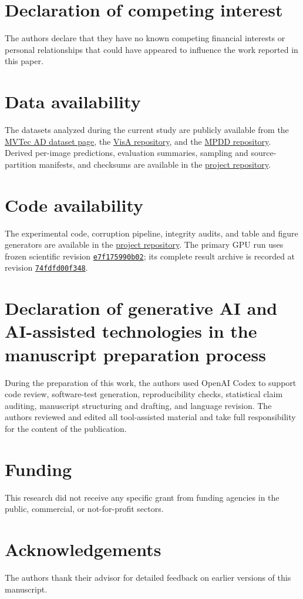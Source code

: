 
\section*{Declaration of competing interest}
The authors declare that they have no known competing financial interests or personal relationships that could have appeared to influence the work reported in this paper.

\section*{Data availability}
The datasets analyzed during the current study are publicly available from the \href{https://www.mvtec.com/company/research/datasets/mvtec-ad}{MVTec AD dataset page}, the \href{https://github.com/amazon-science/spot-diff}{VisA repository}, and the \href{https://github.com/stepanje/MPDD}{MPDD repository}. Derived per-image predictions, evaluation summaries, sampling and source-partition manifests, and checksums are available in the \href{https://github.com/OxyzGiaHuy/AD}{project repository}.

\section*{Code availability}
The experimental code, corruption pipeline, integrity audits, and table and figure generators are available in the \href{https://github.com/OxyzGiaHuy/AD}{project repository}. The primary GPU run uses frozen scientific revision \href{https://github.com/OxyzGiaHuy/AD/commit/e7f175990b02aa3cbdb7c92250d57c0272abef9d}{\texttt{e7f175990b02}}; its complete result archive is recorded at revision \href{https://github.com/OxyzGiaHuy/AD/commit/74fdfd00f3480f3bc5db42e29bc51ec0768ab881}{\texttt{74fdfd00f348}}.

\section*{Declaration of generative AI and AI-assisted technologies in the manuscript preparation process}
During the preparation of this work, the authors used OpenAI Codex to support code review, software-test generation, reproducibility checks, statistical claim auditing, manuscript structuring and drafting, and language revision. The authors reviewed and edited all tool-assisted material and take full responsibility for the content of the publication.

\section*{Funding}
This research did not receive any specific grant from funding agencies in the public, commercial, or not-for-profit sectors.

\section*{Acknowledgements}
The authors thank their advisor for detailed feedback on earlier versions of this manuscript.
